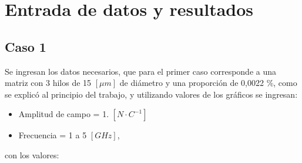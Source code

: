 \documentclass[12pt,letterpaper]{report}
\numberwithin{equation}{section}
\begin{document}
\section{Entrada de datos y resultados}

\subsection{Caso 1}

Se ingresan los datos necesarios, que para el primer caso corresponde a una matriz con 3 hilos de 15 $[\mu m]$ de diámetro y una proporción de 0,0022 \%, como se explicó al principio del trabajo, y utilizando valores de los gráficos se ingresan:

\begin{itemize}
	\item Amplitud de campo = 1. $[N \cdotp C^{-1}]$
	\item Frecuencia = 1 a 5 $[GHz]$,
\end{itemize}
\noindent con los valores:
\end{document}

